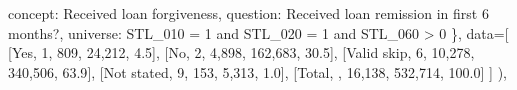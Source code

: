 \documentclass[
  11pt,
  a4paper,
]{article}
\newenvironment{Shaded}{\begin{snugshade}}{\end{snugshade}}
\newcommand{\NormalTok}[1]{\textcolor[rgb]{0.00,0.23,0.31}{#1}}
\newcommand{\OperatorTok}[1]{\textcolor[rgb]{0.37,0.37,0.37}{#1}}
\newcommand{\StringTok}[1]{\textcolor[rgb]{0.13,0.47,0.30}{#1}}
\begin{document}
\begin{Shaded}
\begin{Highlighting}[]
                    \StringTok{\textquotesingle{}concept\textquotesingle{}}\NormalTok{: }\StringTok{\textquotesingle{}Received loan forgiveness\textquotesingle{}}\NormalTok{,}
                    \StringTok{\textquotesingle{}question\textquotesingle{}}\NormalTok{: }\StringTok{\textquotesingle{}Received loan remission in first 6 months?\textquotesingle{}}\NormalTok{,}
                    \StringTok{\textquotesingle{}universe\textquotesingle{}}\NormalTok{: }\StringTok{\textquotesingle{}STL\_010 = 1 and STL\_020 = 1 and STL\_060 \textgreater{} 0\textquotesingle{}}
\NormalTok{                \},}
\NormalTok{                data}\OperatorTok{=}\NormalTok{[}
\NormalTok{                    [}\StringTok{\textquotesingle{}Yes\textquotesingle{}}\NormalTok{, }\StringTok{\textquotesingle{}1\textquotesingle{}}\NormalTok{, }\StringTok{\textquotesingle{}809\textquotesingle{}}\NormalTok{, }\StringTok{\textquotesingle{}24,212\textquotesingle{}}\NormalTok{, }\StringTok{\textquotesingle{}4.5\textquotesingle{}}\NormalTok{],}
\NormalTok{                    [}\StringTok{\textquotesingle{}No\textquotesingle{}}\NormalTok{, }\StringTok{\textquotesingle{}2\textquotesingle{}}\NormalTok{, }\StringTok{\textquotesingle{}4,898\textquotesingle{}}\NormalTok{, }\StringTok{\textquotesingle{}162,683\textquotesingle{}}\NormalTok{, }\StringTok{\textquotesingle{}30.5\textquotesingle{}}\NormalTok{],}
\NormalTok{                    [}\StringTok{\textquotesingle{}Valid skip\textquotesingle{}}\NormalTok{, }\StringTok{\textquotesingle{}6\textquotesingle{}}\NormalTok{, }\StringTok{\textquotesingle{}10,278\textquotesingle{}}\NormalTok{, }\StringTok{\textquotesingle{}340,506\textquotesingle{}}\NormalTok{, }\StringTok{\textquotesingle{}63.9\textquotesingle{}}\NormalTok{],}
\NormalTok{                    [}\StringTok{\textquotesingle{}Not stated\textquotesingle{}}\NormalTok{, }\StringTok{\textquotesingle{}9\textquotesingle{}}\NormalTok{, }\StringTok{\textquotesingle{}153\textquotesingle{}}\NormalTok{, }\StringTok{\textquotesingle{}5,313\textquotesingle{}}\NormalTok{, }\StringTok{\textquotesingle{}1.0\textquotesingle{}}\NormalTok{],}
\NormalTok{                    [}\StringTok{\textquotesingle{}Total\textquotesingle{}}\NormalTok{, }\StringTok{\textquotesingle{}\textquotesingle{}}\NormalTok{, }\StringTok{\textquotesingle{}16,138\textquotesingle{}}\NormalTok{, }\StringTok{\textquotesingle{}532,714\textquotesingle{}}\NormalTok{, }\StringTok{\textquotesingle{}100.0\textquotesingle{}}\NormalTok{]}
\NormalTok{                ]}
\NormalTok{            ),}


\end{Highlighting}
\end{Shaded}
\end{document}
